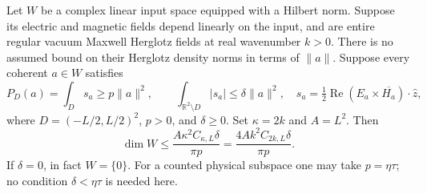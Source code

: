 \begin{theorem}
\label{cb:count}
Let $W$ be a complex linear input space equipped with a Hilbert norm. Suppose
its electric and magnetic fields depend linearly on the input, and are
entire regular vacuum Maxwell Herglotz fields at real wavenumber $k>0$.
There is no assumed bound on their Herglotz density norms in terms of
$\|a\|$. Suppose every coherent $a\in W$ satisfies
\begin{equation}
 P_D(a)=\int_Ds_a\geq p\|a\|^2,\qquad
 \int_{\mathbb R^2\setminus D}|s_a|\leq\delta\|a\|^2,
 \quad
 s_a=\tfrac12\operatorname{Re}(E_a\times\overline{H_a})\cdot\widehat z,
 \label{cb:fluxhypotheses}
\end{equation}
where $D=(-L/2,L/2)^2$, $p>0$, and $\delta\geq0$. Set $\kappa=2k$ and
$A=L^2$. Then
\begin{equation}
 \dim W\leq\frac{A\kappa^2 C_{\kappa,L}\delta}{\pi p}
          =\frac{4Ak^2 C_{2k,L}\delta}{\pi p}.
 \label{cb:dimension}
\end{equation}
If $\delta=0$, in fact $W=\{0\}$. For a counted physical subspace one
may take $p=\eta\tau$; no condition $\delta<\eta\tau$ is needed here.
\end{theorem}
